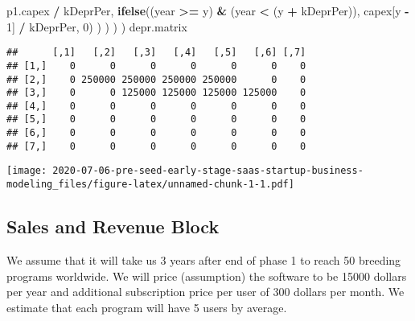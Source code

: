 \documentclass[
]{article}
\newenvironment{Shaded}{\begin{snugshade}}{\end{snugshade}}
\newcommand{\DataTypeTok}[1]{\textcolor[rgb]{0.13,0.29,0.53}{#1}}
\newcommand{\DecValTok}[1]{\textcolor[rgb]{0.00,0.00,0.81}{#1}}
\newcommand{\FloatTok}[1]{\textcolor[rgb]{0.00,0.00,0.81}{#1}}
\newcommand{\KeywordTok}[1]{\textcolor[rgb]{0.13,0.29,0.53}{\textbf{#1}}}
\newcommand{\NormalTok}[1]{#1}
\newcommand{\OperatorTok}[1]{\textcolor[rgb]{0.81,0.36,0.00}{\textbf{#1}}}
\newcommand{\StringTok}[1]{\textcolor[rgb]{0.31,0.60,0.02}{#1}}
\begin{document}
\begin{Shaded}
\begin{Highlighting}[]
\NormalTok{p1.capex }\OperatorTok{/}\StringTok{ }\NormalTok{kDeprPer,}
\KeywordTok{ifelse}\NormalTok{((year }\OperatorTok{>=}\StringTok{ }\NormalTok{y) }\OperatorTok{&}\StringTok{ }\NormalTok{(year }\OperatorTok{<}\StringTok{ }\NormalTok{(y }\OperatorTok{+}\StringTok{ }\NormalTok{kDeprPer)),}
\NormalTok{capex[y }\OperatorTok{-}\StringTok{ }\DecValTok{1}\NormalTok{] }\OperatorTok{/}\StringTok{ }\NormalTok{kDeprPer, }\DecValTok{0}\NormalTok{)}
\NormalTok{)}
\NormalTok{)}
\NormalTok{)}
\NormalTok{)}
\NormalTok{depr.matrix}
\end{Highlighting}
\end{Shaded}

\begin{verbatim}
##      [,1]   [,2]   [,3]   [,4]   [,5]   [,6] [,7]
## [1,]    0      0      0      0      0      0    0
## [2,]    0 250000 250000 250000 250000      0    0
## [3,]    0      0 125000 125000 125000 125000    0
## [4,]    0      0      0      0      0      0    0
## [5,]    0      0      0      0      0      0    0
## [6,]    0      0      0      0      0      0    0
## [7,]    0      0      0      0      0      0    0
\end{verbatim}

\begin{Shaded}
\end{Shaded}

\texttt{[image: 2020-07-06-pre-seed-early-stage-saas-startup-business-modeling\_files/figure-latex/unnamed-chunk-1-1.pdf]}

\hypertarget{sales-and-revenue-block}{%
\subsection{Sales and Revenue Block}\label{sales-and-revenue-block}}

We assume that it will take us 3 years after end of phase 1 to reach 50
breeding programs worldwide. We will price (assumption) the software to
be 15000 dollars per year and additional subscription price per user of
300 dollars per month. We estimate that each program will have 5 users
by average.
\end{document}

